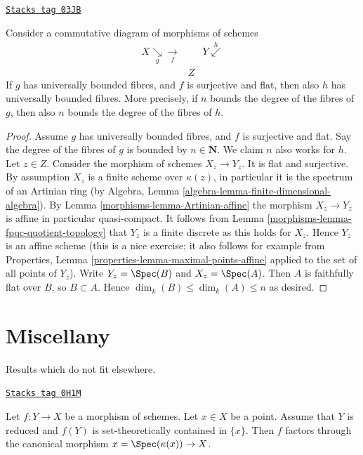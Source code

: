 \begin{lemma}
\label{morphisms-lemma-universally-bounded-permanence}
\href{https://stacks.math.columbia.edu/tag/03JB}{\texttt{Stacks tag 03JB}}

Consider a commutative diagram of morphisms of schemes
$$
\begin{array}{ccc}X \underset{g}{\searrow}\underset{f}{\longrightarrow} &  & Y \overset{h}{\swarrow} \\  & Z & \end{array}
$$
If $g$ has universally bounded fibres, and $f$ is surjective and flat,
then also $h$ has universally bounded fibres. More precisely, if $n$
bounds the degree of the fibres of $g$, then also $n$ bounds the
degree of the fibres of $h$.
\end{lemma}

\begin{proof}

Assume $g$ has universally bounded fibres, and $f$ is surjective and flat.
Say the degree of the fibres of $g$ is bounded by $n \in \mathbf{N}$.
We claim $n$ also works for $h$.
Let $z \in Z$. Consider the morphism of schemes $X_z \to Y_z$.
It is flat and surjective. By assumption $X_z$ is a finite scheme
over $\kappa(z)$, in particular it is the spectrum of an
Artinian ring (by
Algebra, Lemma \ref{algebra-lemma-finite-dimensional-algebra}).
By Lemma \ref{morphisms-lemma-Artinian-affine} the morphism $X_z \to Y_z$ is affine
in particular quasi-compact. It follows from
Lemma \ref{morphisms-lemma-fpqc-quotient-topology}
that $Y_z$ is a finite discrete as this holds for $X_z$.
Hence $Y_z$ is an affine scheme (this is a nice exercise; it also follows
for example from
Properties, Lemma \ref{properties-lemma-maximal-points-affine}
applied to the set of all points of $Y_z$).
Write $Y_z = \Spec(B)$ and $X_z = \Spec(A)$.
Then $A$ is faithfully flat over $B$, so $B \subset A$.
Hence $\dim_k(B) \leq \dim_k(A) \leq n$ as desired.
\end{proof}

\section{Miscellany}
\label{morphisms-section-misc}
Results which do not fit elsewhere.

\begin{lemma}
\label{morphisms-lemma-factor-through-point}
\href{https://stacks.math.columbia.edu/tag/0H1M}{\texttt{Stacks tag 0H1M}}

Let $f : Y \to X$ be a morphism of schemes. Let $x \in X$ be a point.
Assume that $Y$ is reduced and $f(Y)$ is set-theoretically contained
in $\{x\}$. Then $f$ factors through the canonical morphism
$x = \Spec(\kappa(x)) \to X$.
\end{lemma}

